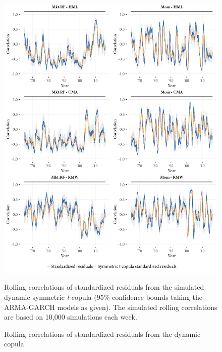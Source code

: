 \begin{figure}[!ht]
  \centering
  \includegraphics[width=\textwidth]{graphics/rolling_simulated1.png}
  \footnotesize
  \caption{Rolling correlations of standardized residuals from the dynamic copula}
  \begin{longcaption}
    Rolling correlations of standardized residuals from the simulated dynamic symmetric \textit{t} copula (95\% confidence bounds taking the ARMA-GARCH models as given). The simulated rolling correlations are based on 10,000 simulations each week.
  \end{longcaption}
  \label{fig:rolling_simulated}
\end{figure}
